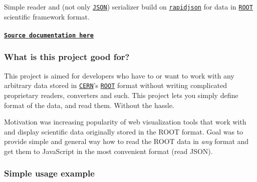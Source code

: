Simple reader and (not only \href{http://json.org/}{\tt J\+S\+O\+N}) serializer build on \href{https://github.com/miloyip/rapidjson}{\tt rapidjson} for data in \href{https://root.cern.ch/}{\tt R\+O\+O\+T} scientific framework format.

\paragraph*{\href{https://jiri-vyc.github.io/rootdatareader/docs/}{\tt Source documentation here}}

\subsubsection*{What is this project good for?}

This project is aimed for developers who have to or want to work with any arbitrary data stored in \href{http://home.cern/}{\tt C\+E\+R\+N}'s \href{https://root.cern.ch/}{\tt R\+O\+O\+T} format without writing complicated proprietary readers, converters and such. This project lets you simply define format of the data, and read them. Without the hassle.

Motivation was increasing popularity of web visualization tools that work with and display scientific data originally stored in the R\+O\+O\+T format. Goal was to provide simple and general way how to read the R\+O\+O\+T data in {\itshape any} format and get them to Java\+Script in the most convenient format (read J\+S\+O\+N).

\subsubsection*{Simple usage example}


